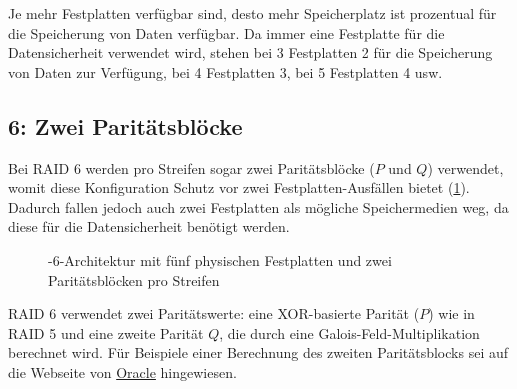 Je mehr Festplatten verfügbar sind, desto mehr Speicherplatz ist prozentual für die Speicherung von Daten verfügbar. Da immer eine Festplatte für die Datensicherheit verwendet wird, stehen bei 3 Festplatten 2 für die Speicherung von Daten zur Verfügung, bei 4 Festplatten 3, bei 5 Festplatten 4 usw.

\subsection{ 6: Zwei Paritätsblöcke}

Bei \gls{RAID} 6 werden pro Streifen sogar zwei Paritätsblöcke ($P$ und $Q$) verwendet, womit diese Konfiguration Schutz vor zwei Festplatten-Ausfällen bietet (\cref{fig:raid6}). Dadurch fallen jedoch auch zwei Festplatten als mögliche Speichermedien weg, da diese für die Datensicherheit benötigt werden.

\begin{figure}[H]
    \centering
    
    \caption[-6-Architektur mit fünf physischen Festplatten und zwei Paritätsblöcken pro Streifen]{-6-Architektur mit fünf physischen Festplatten und zwei Paritätsblöcken pro Streifen}
    \label{fig:raid6}
\end{figure}

\gls{RAID} 6 verwendet zwei Paritätswerte: eine \acrshort{XOR}-basierte Parität ($P$) wie in \gls{RAID} 5 und eine zweite Parität $Q$, die durch eine Galois-Feld-Multiplikation berechnet wird. Für Beispiele einer Berechnung des zweiten Paritätsblocks sei auf die Webseite von \href{https://blogs.oracle.com/solaris/post/understanding-raid-6-with-junior-high-math}{Oracle} hingewiesen.

